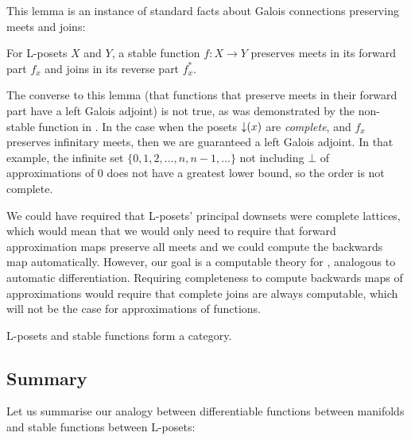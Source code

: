 This lemma is an instance of standard facts about Galois connections
preserving meets and joins:

\begin{lemma}
  For L-posets $X$ and $Y$, a stable function $f : X \to Y$ preserves
  meets in its forward part $f_x$ and joins in its reverse part
  $f^*_x$.
\end{lemma}

The converse to this lemma (that functions that preserve meets in their forward part have a left Galois adjoint) is not true, as was demonstrated by the non-stable function in . In the case when the posets $\mathop{\downarrow}(x)$ are \emph{complete}, and $f_x$ preserves infinitary meets, then we are guaranteed a left Galois adjoint. In that example, the infinite set $\{0, 1, 2, \dots, n, n-1, \dots\}$ not including $\bot$ of approximations of $0$ does not have a greatest lower bound, so the order is not complete.

We could have required that L-posets' principal downsets were complete lattices, which would mean that we would only need to require that forward approximation maps preserve all meets and we could compute the backwards map automatically. However, our goal is a computable theory for \GPS, analogous to automatic differentiation. Requiring completeness to compute backwards maps of approximations would require that complete joins are always computable, which will not be the case for approximations of functions.

\begin{proposition}
  L-posets and stable functions form a category. 
\end{proposition}


\subsection{Summary}
\label{sec:diff-stab-summary}

Let us summarise our analogy between differentiable functions between manifolds and stable functions between L-posets:

